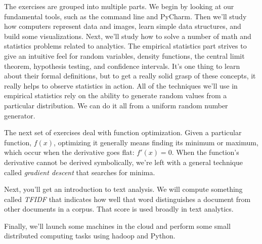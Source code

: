 {\begin{center}
\end{center}
}

The exercises are grouped into multiple parts. We begin by looking at our fundamental tools, such as the command line and PyCharm. Then we'll study how computers represent data and images, learn simple data structures, and build some visualizations. Next, we'll study how to solve a number of math and statistics problems related to analytics. The empirical statistics part strives to give an intuitive feel for random variables, density functions, the central limit theorem, hypothesis testing, and confidence intervals. It's one thing to learn about their formal definitions, but to get a really solid grasp of these concepts, it really helps to observe statistics in action. All of the techniques we'll use in empirical statistics rely on the ability to generate random values from a particular distribution. We can do it all from a uniform random number generator.

The next set of exercises deal with function optimization. Given a particular function, $f(x)$, optimizing it generally means finding its minimum or maximum, which occur when the derivative goes flat: $f'(x) = 0$. When the function's derivative cannot be derived symbolically, we're left with a general technique called {\em gradient descent} that searches for minima.

Next, you'll get an introduction to text analysis. We will compute something called {\em TFIDF} that indicates how well that word distinguishes a document from other documents in a corpus.  That score is used broadly in text analytics.

Finally, we'll launch some machines in the cloud and perform some small distributed computing tasks using hadoop and Python.


